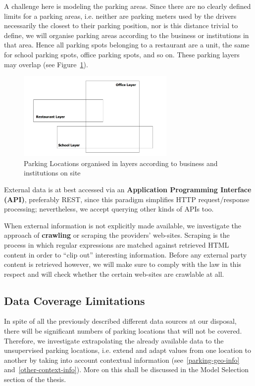 \documentclass{article}
\begin{document}
A challenge here is modeling the parking areas. Since there are no clearly defined limits for a parking areas, i.e. neither are parking meters used by the drivers necessarily the closest to their parking position, nor is this distance trivial to define, we will organise parking areas according to the business or institutions in that area. Hence all parking spots belonging to a restaurant are a unit, the same for school parking spots, office parking spots, and so on. These parking layers may overlap (see Figure~\ref{fig:parking-layers}).

\begin{figure}[!ht]
    \centering
    \includegraphics[width=3.0in]{ParkingLayers}
    \caption{Parking Locations organised in layers according to business and institutions on site}
    \label{fig:parking-layers}
\end{figure}

External data is at best accessed via an \textbf{Application Programming Interface (API)}, preferably REST, since this paradigm simplifies HTTP request/response processing; nevertheless, we accept querying other kinds of APIs too.

When external information is not explicitly made available, we investigate the approach of \textbf{crawling} or scraping the providers' web-sites. Scraping is the process in which regular expressions are matched against retrieved HTML content in order to ``clip out'' interesting information. Before any external party content is retrieved however, we will make sure to comply with the law in this respect and will check whether the certain web-sites are crawlable at all.

\subsection{Data Coverage Limitations}
In spite of all the previously described different data sources at our disposal, there will be significant numbers of parking locations that will not be covered. Therefore, we investigate extrapolating the already available data to the unsupervised parking locations, i.e. extend and adapt values from one location to another by taking into account contextual information (see~\ref{parking-geo-info} and~\ref{other-context-info}). More on this shall be discussed in the Model Selection section of the thesis.
\end{document}
